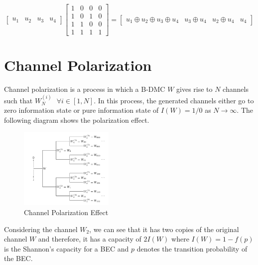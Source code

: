 \documentclass{article}
\begin{document}
\[
\begin{bmatrix}
u_{1} & u_{2} &u_{3}&u_{4}
\end{bmatrix}
\begin{bmatrix}
1 & 0 & 0 & 0 \\
1 & 0 & 1 & 0 \\
1 & 1 & 0 & 0 \\
1 & 1 & 1 & 1
\end{bmatrix}
=
\begin{bmatrix}
u_{1}\oplus u_{2} \oplus u_{3} \oplus u_{4} & u_{3} \oplus u_{4} &  u_{2} \oplus u_{4} & u_{4}
\end{bmatrix}
\] 

\section{Channel Polarization}
Channel polarization is a process in which a B-DMC $W$ gives rise to $N$ channels such that $W_{N}^{(i)} \textrm{ } \forall  i \in [1, N]$. In this process, the generated channels either go to zero information state or pure information state of $I(W) = 1/0$ as $N \rightarrow \infty$. The following diagram shows the polarization effect. 
\begin{figure}[H]
\centering
\includegraphics[width=0.4\textwidth, height=0.2\textheight]{chpol.png}
\caption{Channel Polarization Effect}
\end{figure}
Considering the channel $W_{2}$, we can see that it has two copies of the original channel $W$ and therefore, it has a capacity of $2I(W)$ where $I(W) = 1 - f(p)$ is the Shannon's capacity for a BEC and $p$ denotes the transition probability of the BEC.
\end{document}
